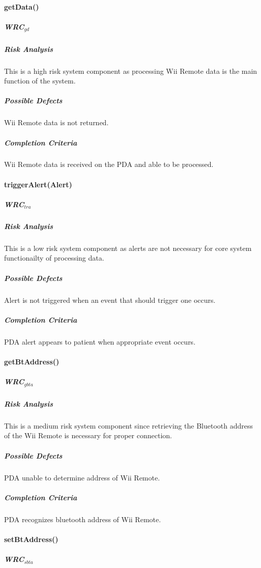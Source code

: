 \documentclass{article}
\begin{document}
\paragraph{getData()}

\subparagraph{WRC$_{gd}$}

\subparagraph{Risk Analysis}
This is a high risk system component as processing Wii Remote data is the main function of the system.

\subparagraph{Possible Defects}
Wii Remote data is not returned.

\subparagraph{Completion Criteria}
Wii Remote data is received on the PDA and able to be processed.

\paragraph{triggerAlert(Alert)}

\subparagraph{WRC$_{tra}$}

\subparagraph{Risk Analysis}
This is a low risk system component as alerts are not necessary for core system functionailty of processing data.

\subparagraph{Possible Defects}
Alert is not triggered when an event that should trigger one occurs.
\subparagraph{Completion Criteria}
PDA alert appears to patient when appropriate event occurs.

\paragraph{getBtAddress()}

\subparagraph{WRC$_{gbta}$}

\subparagraph{Risk Analysis}
This is a medium risk system component since retrieving the Bluetooth address of the Wii Remote is necessary for proper connection.

\subparagraph{Possible Defects}
PDA unable to determine address of Wii Remote.
\subparagraph{Completion Criteria}
PDA recognizes bluetooth address of Wii Remote.

\paragraph{setBtAddress()}

\subparagraph{WRC$_{sbta}$}
\end{document}

